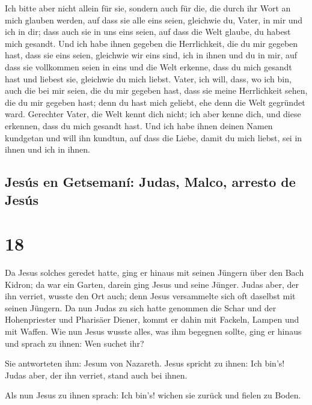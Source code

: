  Ich bitte aber nicht allein für sie, sondern auch für
die, die durch ihr Wort an mich glauben werden,  auf dass
sie alle eins seien, gleichwie du, Vater, in mir und ich in dir; dass
auch sie in uns eins seien, auf dass die Welt glaube, du habest mich
gesandt.  Und ich habe ihnen gegeben die Herrlichkeit,
die du mir gegeben hast, dass sie eins seien, gleichwie wir eins sind,
 ich in ihnen und du in mir, auf dass sie vollkommen
seien in eins und die Welt erkenne, dass du mich gesandt hast und
liebest sie, gleichwie du mich liebst.  Vater, ich will,
dass, wo ich bin, auch die bei mir seien, die du mir gegeben hast, dass
sie meine Herrlichkeit sehen, die du mir gegeben hast; denn du hast mich
geliebt, ehe denn die Welt gegründet ward.  Gerechter
Vater, die Welt kennt dich nicht; ich aber kenne dich, und diese
erkennen, dass du mich gesandt hast.  Und ich habe ihnen
deinen Namen kundgetan und will ihn kundtun, auf dass die Liebe, damit
du mich liebst, sei in ihnen und ich in ihnen.

\hypertarget{jesuxfas-en-getsemanuxed-judas-malco-arresto-de-jesuxfas}{%
\subsection{Jesús en Getsemaní: Judas, Malco, arresto de
Jesús}\label{jesuxfas-en-getsemanuxed-judas-malco-arresto-de-jesuxfas}}

\hypertarget{section-17}{%
\section{18}\label{section-17}}

 Da Jesus solches geredet hatte, ging er hinaus mit seinen
Jüngern über den Bach Kidron; da war ein Garten, darein ging Jesus und
seine Jünger.  Judas aber, der ihn verriet, wusste den Ort
auch; denn Jesus versammelte sich oft daselbst mit seinen Jüngern.
 Da nun Judas zu sich hatte genommen die Schar und der
Hohenpriester und Pharisäer Diener, kommt er dahin mit Fackeln, Lampen
und mit Waffen.  Wie nun Jesus wusste alles, was ihm
begegnen sollte, ging er hinaus und sprach zu ihnen: Wen suchet ihr?

 Sie antworteten ihm: Jesum von Nazareth. Jesus spricht zu
ihnen: Ich bin's! Judas aber, der ihn verriet, stand auch bei ihnen.

 Als nun Jesus zu ihnen sprach: Ich bin's! wichen sie
zurück und fielen zu Boden.

